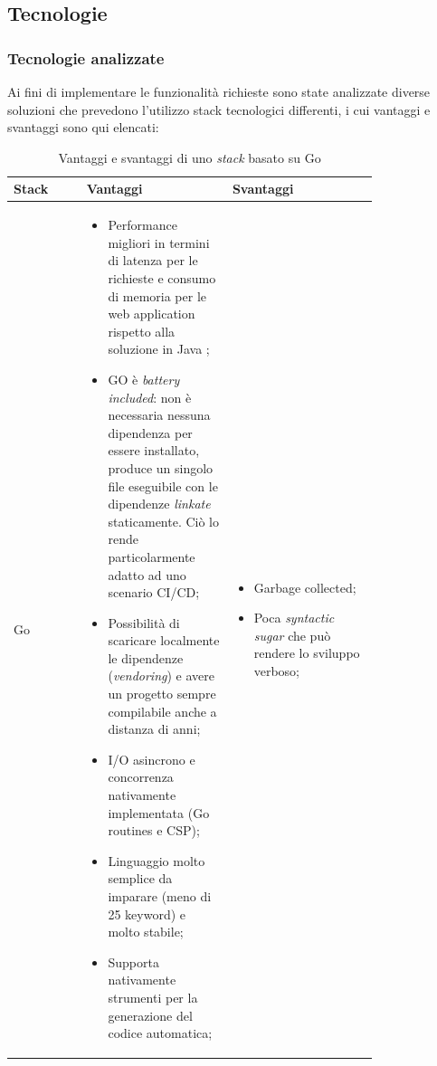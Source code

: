 \documentclass{article}
\begin{document}
\subsection{Tecnologie}
\subsubsection{Tecnologie analizzate}
Ai fini di implementare le funzionalità richieste sono state analizzate diverse soluzioni che prevedono l'utilizzo stack tecnologici differenti, i cui vantaggi e svantaggi sono qui elencati:

\begin{table}[H]
    \centering
    \begin{tabular}{|l|p{0.4\linewidth}|p{0.4\linewidth}|}
        \hline
         Stack & Vantaggi & Svantaggi \\
        \hline
        \hline
        Go  & 
        \begin{itemize}
          \item Performance migliori in termini di latenza per le richieste e consumo di memoria per le web application rispetto alla soluzione in Java \cite{go_java_php};
          \item GO è \textit{battery included}: non è necessaria nessuna dipendenza per essere installato,  produce un singolo file eseguibile con le dipendenze \textit{linkate} staticamente. Ciò lo rende particolarmente adatto ad uno scenario CI/CD;
          \item Possibilità di scaricare localmente le dipendenze (\textit{vendoring}) e avere un progetto sempre compilabile anche a distanza di anni;
          \item I/O asincrono e concorrenza nativamente implementata (Go routines e CSP);
          \item Linguaggio molto semplice da imparare (meno di 25 keyword) e molto stabile;
          \item Supporta nativamente strumenti per la generazione del codice automatica;
        \end{itemize} 
        & 
        \begin{itemize}
            \item Garbage collected;
            \item Poca \textit{syntactic sugar} che può rendere lo sviluppo verboso;
        \end{itemize}\\ 
        \hline
    \end{tabular}
    \caption{Vantaggi e svantaggi di uno \textit{stack} basato su Go}
    \label{tab:go_tech_stack}
\end{table}
\end{document}
